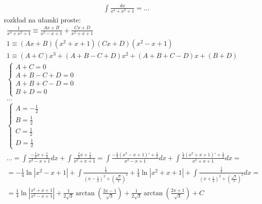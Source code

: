 
\begin{gather*}\int \frac{dx}{x^4+x^2+1}=\ldots\end{gather*}
rozkład na ułamki proste:
\begin{gather*}\frac{1}{x^4+x^2+1} \equiv \frac{Ax+B}{x^2-x+1}+\frac{Cx+D}{x^2+x+1} \\
1 \equiv (Ax+B)(x^2+x+1)(Cx+D)(x^2-x+1) \\
1 \equiv (A+C)x^3+(A+B-C+D)x^2+(A+B+C-D)x+(B+D) \\
\begin{cases} A+C=0 \\ A+B-C+D=0 \\ A+B+C-D=0 \\ B+D=0 \end{cases} \\
\ldots \\
\begin{cases} A=-\frac{1}{2} \\ B=\frac{1}{2} \\ C=\frac{1}{2} \\ D=\frac{1}{2} \end{cases} \\
\ldots = \int \frac{-\frac{1}{2}x+\frac{1}{2}}{x^2-x+1}dx + \int \frac{\frac{1}{2}x+\frac{1}{2}}{x^2+x+1} = \int \frac{-\frac{1}{4}(x^2-x+1)'+\frac{1}{4}}{x^2-x+1}dx + \int \frac{\frac{1}{4}(x^2+x+1)'+\frac{1}{4}}{x^2+x+1}dx = \\
= -\frac{1}{4}\ln|x^2-x+1|+\int \frac{\frac{1}{4}}{(x-\frac{1}{2})^2+(\frac{\sqrt{3}}{2})^2} + \frac{1}{4}\ln|x^2+x+1|+\int \frac{\frac{1}{4}}{(x+\frac{1}{2})^2+(\frac{\sqrt{3}}{2})^2}dx = \\
= \frac{1}{4}\ln\left|\frac{x^2+x+1}{x^2-x+1}\right|+\frac{1}{2\sqrt{3}}\arctan \left(\frac{2x-1}{\sqrt{3}}\right)+\frac{1}{2\sqrt{3}}\arctan \left(\frac{2x+1}{\sqrt{3}}\right)+C\end{gather*}



